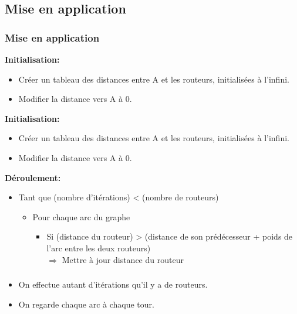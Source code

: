 \documentclass[svgnames,11pt]{beamer}
\begin{document}
\subsection{Mise en application}
\begin{frame}[fragile]
    \frametitle{Mise en application}
\textbf{Initialisation:}
\begin{itemize}
    \item Créer un tableau des distances entre A et les routeurs, initialisées à l'infini.
    \item Modifier la distance vers A à 0.        
\end{itemize}
\end{frame}
\begin{frame}[fragile]
\textbf{Initialisation:}
\begin{itemize}
    \item Créer un tableau des distances entre A et les routeurs, initialisées à l'infini.
    \item Modifier la distance vers A à 0.        
\end{itemize}
\textbf{Déroulement:}
\begin{itemize}
    \item Tant que (nombre d'itérations) < (nombre de routeurs)
    \begin{itemize}
        \item Pour chaque arc du graphe
        \begin{itemize}
            \item Si (distance du routeur) > (distance de son prédécesseur + poids de l'arc entre les deux routeurs)
            \\\hspace{1cm}$\Rightarrow$ Mettre à jour distance du routeur
        \end{itemize}
    \end{itemize}
\end{itemize}
\end{frame}
\begin{frame}
    \frametitle{}

    \begin{aretenir}[Observations]
    \begin{itemize}
        \item On effectue autant d'itérations qu'il y a de routeurs.
        \item On regarde chaque arc à chaque tour.
    \end{itemize}
    \end{aretenir}

\end{frame}
\end{document}
